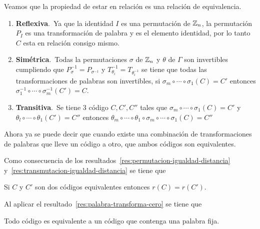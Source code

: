 Veamos que la propiedad de estar en relación es una relación de equivalencia.
\begin{enumerate}
	\item \textbf{Reflexiva}.\ Ya que la identidad $I$ es una permutación de $\mathbb{Z}_n$, la permutación $P_I$ es una transformación de palabra y es el elemento identidad, por lo tanto $C$ esta en relación consigo mismo.
	\item \textbf{Simétrica}.\ Todas la permutaciones $\sigma$ de $\mathbb{Z}_n$ y $\theta$ de $\Gamma$ son invertibles cumpliendo que $P_\sigma^{-1}=P_{\sigma^{-1}}$ y $T_{\theta_i}^{-1}=T_{\theta_i^{-1}}$ se tiene que todas las transformaciones de palabras son invertibles, si $\sigma_m\circ\cdots\circ \sigma_1(C)= C'$ entonces $\sigma_1^{-1}\circ\cdots\circ \sigma_m^{-1}(C')= C$.
	\item \textbf{Transitiva}.\ Se tiene 3 código $C, C', C''$ tales que $\sigma_m\circ\cdots\circ \sigma_1(C)= C'$ y $\theta_l\circ\cdots\circ \theta_1(C')= C''$ entonces $\theta_m\circ\cdots\circ \theta_1\circ\sigma_m\circ\cdots\circ \sigma_1(C)= C''$
\end{enumerate}

Ahora ya se puede decir que cuando existe una combinación de transformaciones de palabras que lleve un código a otro, que ambos códigos son equivalentes.

Como consecuencia de los resultados~\eqref{res:permutacion-igualdad-distancia} y~\eqref{res:transmutacion-igualdad-distancia} se tiene que
\begin{lemma}
	Si $C$ y $C'$ son dos códigos equivalentes entonces $r(C)=r(C')$.
\end{lemma}
Al aplicar el resultado~\eqref{res:palabra-transforma-cero} se tiene que
\begin{lemma}
	Todo código es equivalente a un código que contenga una palabra fija.
\end{lemma}

